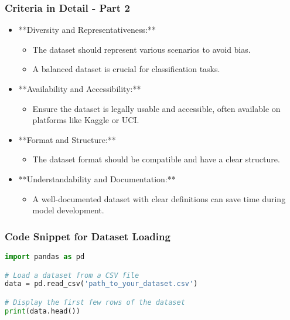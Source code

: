\documentclass[aspectratio=169]{beamer}
\begin{document}
\begin{frame}[fragile]
    \frametitle{Criteria in Detail - Part 2}
    
    \begin{itemize}
        \item **Diversity and Representativeness:**
            \begin{itemize}
                \item The dataset should represent various scenarios to avoid bias.
                \item A balanced dataset is crucial for classification tasks.
            \end{itemize}
        
        \item **Availability and Accessibility:**
            \begin{itemize}
                \item Ensure the dataset is legally usable and accessible, often available on platforms like Kaggle or UCI.
            \end{itemize}

        \item **Format and Structure:**
            \begin{itemize}
                \item The dataset format should be compatible and have a clear structure.
            \end{itemize}
        
        \item **Understandability and Documentation:**
            \begin{itemize}
                \item A well-documented dataset with clear definitions can save time during model development.
            \end{itemize}
    \end{itemize}
\end{frame}

\begin{frame}[fragile]
    \frametitle{Code Snippet for Dataset Loading}
        \begin{lstlisting}[language=Python]
import pandas as pd

# Load a dataset from a CSV file
data = pd.read_csv('path_to_your_dataset.csv')

# Display the first few rows of the dataset
print(data.head())
        \end{lstlisting}
\end{frame}
\end{document}
